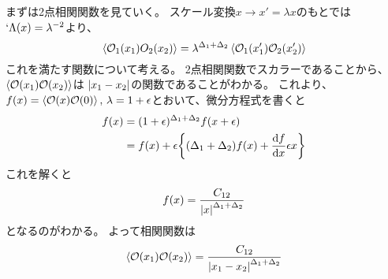 \documentclass[../../master.tex]{subfiles}
\begin{document}
まずは2点相関関数を見ていく。
スケール変換\(x\rightarrow x'=\lambda x\)のもとでは\(`\Lambda(x) =\lambda^{-2}\)より、
\begin{equation}
    \ev{\mathcal{O}_1(x_1){O}_2(x_2)}
    = \lambda^{\Delta_1 + \Delta_2}\ev{\mathcal{O}_1(x'_1)\mathcal{O}_2(x'_2)}
\end{equation}
これを満たす関数について考える。
2点相関関数でスカラーであることから、\(\ev{\mathcal{O}(x_1)\mathcal{O}(x_2)}\)は
\(\abs{x_1-x_2}\)の関数であることがわかる。
これより、\(f(x) = \ev{\mathcal{O}(x)\mathcal{O}(0)},\,\lambda=1+\epsilon\)とおいて、微分方程式を書くと
\begin{align*}
    f(x)
    &= (1+\epsilon)^{\Delta_1 + \Delta_2} f(x + \epsilon)\\
    &= f(x) + \epsilon\qty{(\Delta_1 + \Delta_2)f(x) + \dv{f}{x}\epsilon x}
\end{align*}
これを解くと
\begin{equation*}
    f(x) = \frac{C_{12}}{\abs{x}^{\Delta_1 + \Delta_2}}
\end{equation*}
となるのがわかる。
よって相関関数は
\begin{equation}
    \ev{\mathcal{O}(x_1)\mathcal{O}(x_2)}= \frac{C_{12}}{\abs{x_1-x_2}^{\Delta_1 + \Delta_2}}
\end{equation}
\end{document}
